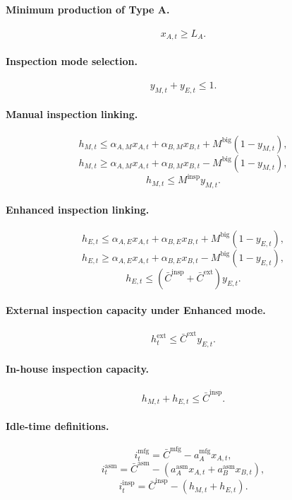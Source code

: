 \paragraph{Minimum production of Type A.}
\[
x_{A,t} \ge L_A.
\]

\paragraph{Inspection mode selection.}
\[
y_{M,t}+y_{E,t}\le 1.
\]

\paragraph{Manual inspection linking.}
\[
h_{M,t} \le \alpha_{A,M}x_{A,t}+\alpha_{B,M}x_{B,t}+M^{\mathrm{big}}(1-y_{M,t}),
\]
\[
h_{M,t} \ge \alpha_{A,M}x_{A,t}+\alpha_{B,M}x_{B,t}-M^{\mathrm{big}}(1-y_{M,t}),
\]
\[
h_{M,t} \le M^{\mathrm{insp}} y_{M,t}.
\]

\paragraph{Enhanced inspection linking.}
\[
h_{E,t} \le \alpha_{A,E}x_{A,t}+\alpha_{B,E}x_{B,t}+M^{\mathrm{big}}(1-y_{E,t}),
\]
\[
h_{E,t} \ge \alpha_{A,E}x_{A,t}+\alpha_{B,E}x_{B,t}-M^{\mathrm{big}}(1-y_{E,t}),
\]
\[
h_{E,t} \le (\bar C^{\mathrm{insp}}+\bar C^{\mathrm{ext}}) y_{E,t}.
\]

\paragraph{External inspection capacity under Enhanced mode.}
\[
h^{\mathrm{ext}}_t \le \bar C^{\mathrm{ext}} y_{E,t}.
\]

\paragraph{In-house inspection capacity.}
\[
h_{M,t}+h_{E,t}\le \bar C^{\mathrm{insp}}.
\]

\paragraph{Idle-time definitions.}
\[
i^{\mathrm{mfg}}_t = \bar C^{\mathrm{mfg}} - a_A^{\mathrm{mfg}}x_{A,t},
\]
\[
i^{\mathrm{asm}}_t = \bar C^{\mathrm{asm}} - \left(a_A^{\mathrm{asm}}x_{A,t}+a_B^{\mathrm{asm}}x_{B,t}\right),
\]
\[
i^{\mathrm{insp}}_t = \bar C^{\mathrm{insp}} - (h_{M,t}+h_{E,t}).
\]

